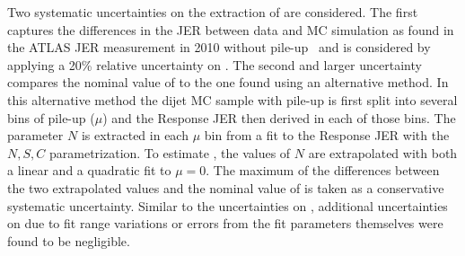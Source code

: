 Two systematic uncertainties on the extraction of \Nmuzero are considered. The first captures the differences in the JER between data and MC simulation as found in the ATLAS JER measurement in 2010 without pile-up~\cite{PERF-2011-04} and is considered by applying a 20\% relative uncertainty on \Nmuzero. The second and larger uncertainty compares the nominal value of \Nmuzero to the one found using an alternative method. In this alternative method the dijet MC sample with pile-up is first split into several bins of pile-up ($\mu$) and the Response JER then derived in each of those bins. The parameter $N$ is extracted in each $\mu$ bin from a fit to the Response JER with the $N, S, C$ parametrization. To estimate \Nmuzero, the values of $N$ are extrapolated with both a linear and a quadratic fit to $\mu=0$. The maximum of the differences between the two extrapolated values and the nominal value of \Nmuzero is taken as a conservative systematic uncertainty.
Similar to the uncertainties on \Npileup, additional uncertainties on \Nmuzero due to fit range variations or errors from the fit parameters themselves were found to be negligible.


